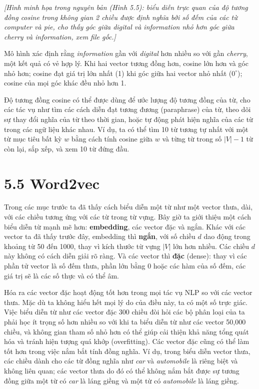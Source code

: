 \textit{[Hình minh họa trong nguyên bản (Hình 5.5): biểu diễn trực quan của độ tương đồng cosine trong không gian 2 chiều được định nghĩa bởi số đếm của các từ \emph{computer} và \emph{pie}, cho thấy góc giữa \emph{digital} và \emph{information} nhỏ hơn góc giữa \emph{cherry} và \emph{information}, xem file gốc.]}

Mô hình xác định rằng \emph{information} gần với \emph{digital} hơn nhiều so với gần \emph{cherry}, một kết quả có vẻ hợp lý. Khi hai vector tương đồng hơn, cosine lớn hơn và góc nhỏ hơn; cosine đạt giá trị lớn nhất (1) khi góc giữa hai vector nhỏ nhất ($0^\circ$); cosine của mọi góc khác đều nhỏ hơn 1.

Độ tương đồng cosine có thể được dùng để ước lượng độ tương đồng của từ, cho các tác vụ như tìm các cách diễn đạt tương đương (paraphrase) của từ, theo dõi sự thay đổi nghĩa của từ theo thời gian, hoặc tự động phát hiện nghĩa của các từ trong các ngữ liệu khác nhau. Ví dụ, ta có thể tìm 10 từ tương tự nhất với một từ mục tiêu bất kỳ $w$ bằng cách tính cosine giữa $w$ và từng từ trong số $|V| - 1$ từ còn lại, sắp xếp, và xem 10 từ đứng đầu.

\section{5.5 Word2vec}

Trong các mục trước ta đã thấy cách biểu diễn một từ như một vector thưa, dài, với các chiều tương ứng với các từ trong từ vựng. Bây giờ ta giới thiệu một cách biểu diễn từ mạnh mẽ hơn: \textbf{embedding}, các vector đặc và ngắn. Khác với các vector ta đã thấy trước đây, embedding thì \textbf{ngắn}, với số chiều $d$ dao động trong khoảng từ 50 đến 1000, thay vì kích thước từ vựng $|V|$ lớn hơn nhiều. Các chiều $d$ này không có cách diễn giải rõ ràng. Và các vector thì \textbf{đặc} (dense): thay vì các phần tử vector là số đếm thưa, phần lớn bằng 0 hoặc các hàm của số đếm, các giá trị sẽ là các số thực và có thể âm.

Hóa ra các vector đặc hoạt động tốt hơn trong mọi tác vụ NLP so với các vector thưa. Mặc dù ta không hiểu hết mọi lý do của điều này, ta có một số trực giác. Việc biểu diễn từ như các vector đặc 300 chiều đòi hỏi các bộ phân loại của ta phải học ít trọng số hơn nhiều so với khi ta biểu diễn từ như các vector 50,000 chiều, và không gian tham số nhỏ hơn có thể giúp cải thiện khả năng tổng quát hóa và tránh hiện tượng quá khớp (overfitting). Các vector đặc cũng có thể làm tốt hơn trong việc nắm bắt tính đồng nghĩa. Ví dụ, trong biểu diễn vector thưa, các chiều dành cho các từ đồng nghĩa như \emph{car} và \emph{automobile} là riêng biệt và không liên quan; các vector thưa do đó có thể không nắm bắt được sự tương đồng giữa một từ có \emph{car} là láng giềng và một từ có \emph{automobile} là láng giềng.

